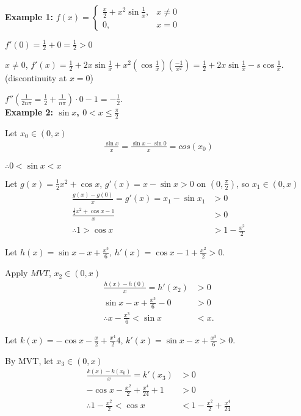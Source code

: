 \documentclass[12pt]{article}
\theoremstyle{plain}
\begin{document}
        
    {\color{Brown} \textbf{Example 1:}
    $f(x) = \begin{cases}
        \frac{x}2+x^2\sin\frac1x, &x\neq 0\\
        0, &x=0
    \end{cases}$

    $f'(0) = \frac 12 + 0 = \frac 12 > 0$

    $x\neq 0$, 
    $f'(x) = \frac 12 + 2x \sin\frac 1x + 
    x^2 (\cos \frac 1x)(\frac{-1}{x^2})
    = \frac12+2x\sin\frac1x-s\cos\frac1x$. \qquad  
    (discontinuity at $x = 0$)

    $f''(\frac1{2n\pi} = \frac12 + \frac1{n\pi}) \cdot 0 - 1 = -\frac12$. \\


    \textbf{Example 2: $\sin x$, $0<x\leq\frac{\pi}2$}

    Let $x_0 \in (0, x)$
    \begin{align*}
        \frac{\sin x}{x} = \frac{\sin x - \sin 0}{x} = cos (x_0)  
    \end{align*}

    $\therefore 0 < \sin x < x$

    Let $g(x) = \frac 12 x^2 + \cos x$, 
    $g'(x) = x - \sin x > 0$ on $(0, \frac{\pi}2)$,
    so $x_1\in(0, x)$
    \begin{align*}
      \frac{g(x)-g(0)}{x} = g'(x) = x_1 - \sin x_1 &> 0\\
        \frac{\frac 12 x^2 + \cos x -1}x &>0\\
				\therefore 1 > \cos x& > 1 -\frac{x^2}2
    \end{align*}
    
    Let $h(x) = \sin x - x + \frac {x^3}6$, 
    $h'(x) = \cos x - 1 + \frac {x^2}2 > 0$.

    Apply $MVT$,  $x_2 \in (0, x)$
    \begin{align*}
        \frac{h(x) - h(0)}x = h'(x_2)&>0\\
        \sin x - x + \frac{x^3}6 -0 &>0\\
        \therefore x-\frac{x^3}6 < \sin x &< x. 
    \end{align*}

    Let $k(x) = -\cos x -\frac x2 + \frac{x^4}24$, 
    $k'(x)=\sin x - x + \frac{x^3}6 > 0$.

    By MVT, let $x_3 \in (0,x)$
    \begin{align*}
      \frac{k(x)-k(x_0)}x = k'(x_3) &>0 \\
        -\cos x - \frac {x^2}2 + \frac {x^4}{24} + 1&>0\\
      	\therefore 1-\frac{x^2}2 < \cos x &< 1-\frac{x^2}2 + \frac{x^4}{24}\\
    \end{align*}

}
\end{document}
